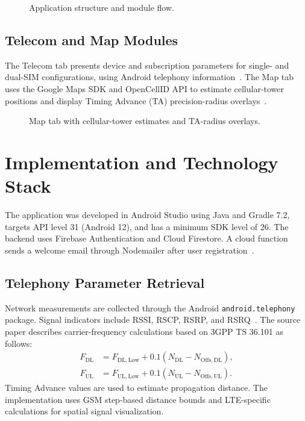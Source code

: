 \documentclass[conference]{IEEEtran}
\newcommand{\figureplaceholder}[1]{%
  \fbox{\parbox[c][1.1in][c]{0.9\columnwidth}{\centering\small #1}}%
}
\begin{document}
\begin{figure}[!t]
  \centering
  \figureplaceholder{Image}
  \caption{Application structure and module flow.}
  \label{fig:application-structure}
\end{figure}

\subsection{Telecom and Map Modules}
The Telecom tab presents device and subscription parameters for single- and dual-SIM configurations, using Android telephony information~\cite{androidTelephony}. The Map tab uses the Google Maps SDK and OpenCellID API to estimate cellular-tower positions and display Timing Advance (TA) precision-radius overlays~\cite{mapsSdk,openCellID}.

\begin{figure}[!t]
  \centering
  \figureplaceholder{Image}
  \caption{Map tab with cellular-tower estimates and TA-radius overlays.}
  \label{fig:map-tab}
\end{figure}

\section{Implementation and Technology Stack}
The application was developed in Android Studio using Java and Gradle 7.2, targets API level 31 (Android 12), and has a minimum SDK level of 26. The backend uses Firebase Authentication and Cloud Firestore. A cloud function sends a welcome email through Nodemailer after user registration~\cite{androidProject,gradleGuide,firebaseDocs,firestoreFunctions}.

\subsection{Telephony Parameter Retrieval}
Network measurements are collected through the Android \texttt{android.telephony} package. Signal indicators include RSSI, RSCP, RSRP, and RSRQ~\cite{androidTelephony}. The source paper describes carrier-frequency calculations based on 3GPP TS 36.101 as follows:
\begin{align}
  F_{\mathrm{DL}} &= F_{\mathrm{DL,Low}} + 0.1\left(N_{\mathrm{DL}} - N_{\mathrm{Offs,DL}}\right), \\
  F_{\mathrm{UL}} &= F_{\mathrm{UL,Low}} + 0.1\left(N_{\mathrm{UL}} - N_{\mathrm{Offs,UL}}\right).
\end{align}
Timing Advance values are used to estimate propagation distance. The implementation uses GSM step-based distance bounds and LTE-specific calculations for spatial signal visualization.
\end{document}
